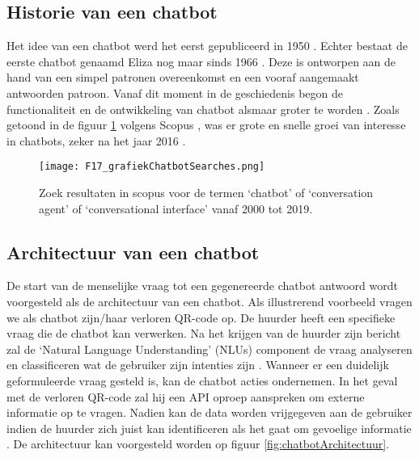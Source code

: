 \subsection{Historie van een chatbot}%
\label{sec:chatbotHistorie}

Het idee van een chatbot werd het eerst gepubliceerd in 1950 \autocite{Turing2009}. Echter bestaat de eerste chatbot genaamd Eliza nog maar sinds 1966 \autocite{Weizenbaum1966}. Deze is ontworpen aan de hand van een simpel patronen overeenkomst en een vooraf aangemaakt antwoorden patroon.  Vanaf dit moment in de geschiedenis begon de functionaliteit en de ontwikkeling van chatbot alsmaar groter te worden \autocite{Brandtzaeg2017}. Zoals getoond in de figuur \ref{fig:graphDocusChatbotAYear} volgens Scopus \autocite{Elsevier2004}, was er grote en snelle groei van interesse in chatbots, zeker na het jaar 2016 \autocite{Adamopoulou2020}.

\begin{figure}[h]
    \centering
    \texttt{[image: F17\_grafiekChatbotSearches.png]}
    \captionsetup{justification=ce/brntering, singlelinecheck=false}    
    \caption{Zoek resultaten in scopus voor de termen ‘chatbot’ of ‘conversation agent’ of ‘conversational interface’ vanaf 2000 tot 2019.}
    \label{fig:graphDocusChatbotAYear}
\end{figure}


\subsection{Architectuur  van een chatbot}%
\label{sec:chatbotArchitectuur}

De start van de menselijke vraag tot een gegenereerde chatbot antwoord wordt voorgesteld als de architectuur van een chatbot. Als illustrerend voorbeeld vragen we als chatbot zijn/haar verloren QR-code op. De huurder heeft een specifieke vraag die de chatbot kan verwerken. Na het krijgen van de huurder zijn bericht zal de ‘Natural Language Understanding’ (NLUs) \autocite{Khanna2015} component de vraag analyseren en classificeren wat de gebruiker zijn intenties zijn \autocite{Tamrakar2021}. Wanneer er een duidelijk geformuleerde vraag gesteld is, kan de chatbot acties ondernemen. In het geval met de verloren QR-code zal hij een API oproep aanspreken om externe informatie op te vragen. Nadien kan de data worden vrijgegeven aan de gebruiker indien de huurder zich juist kan identificeren als het gaat om gevoelige informatie \autocite{Adamopoulou2020}. De architectuur kan voorgesteld worden op figuur \ref{fig:chatbotArchitectuur}.

